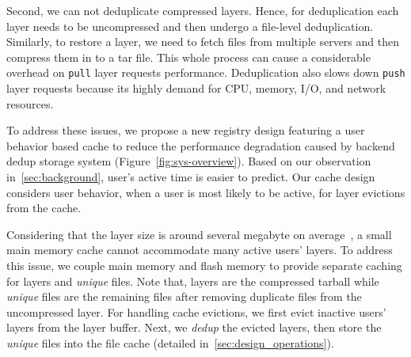 %
Second, we can not deduplicate compressed layers. Hence, for deduplication each layer
needs to be uncompressed and then undergo a file-level deduplication. Similarly,
to restore a layer, we need to fetch files from multiple servers and then compress
them in to a tar file. 
This whole process can cause a 
considerable overhead on \texttt{pull} layer requests performance.
Deduplication also slows down
\texttt{push} layer requests because its highly demand for CPU, memory, I/O, and network resources.

To address these issues, we propose a new registry design featuring a user
behavior based cache to reduce the performance degradation caused by
backend dedup storage system (Figure~\ref{fig:sys-overview}).  Based
on our observation in~\cref{sec:background}, user's active time is easier to predict. 
Our cache design considers user
behavior, \ie when a user is most likely to be active, for layer evictions from the cache.

Considering that the layer size is around several megabyte on
average~\cite{dockerworkload}, a small main memory cache cannot accommodate
many active users' layers. To address this issue, we couple main memory and
flash memory to provide separate caching for layers and \emph{unique} files.
Note that, layers are the compressed tarball 
while \emph{unique} files are the remaining files after removing duplicate files from the uncompressed layer.
For handling
cache evictions, we first evict inactive users' layers from the layer buffer.
Next, we \emph{dedup} the evicted layers, then store the \emph{unique} files
into the file cache (detailed in~\cref{sec:design_operations}). 

